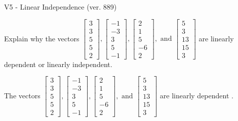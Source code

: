 \begin{exercise}
  \begin{exerciseTitle}V5 - Linear Independence (ver. 889)\end{exerciseTitle}
  \begin{exerciseStatement}
    Explain why the vectors \(\left[\begin{array}{r}
3 \\
3 \\
5 \\
5 \\
2
\end{array}\right] , \left[\begin{array}{r}
-1 \\
-3 \\
3 \\
5 \\
-1
\end{array}\right] , \left[\begin{array}{r}
2 \\
1 \\
5 \\
-6 \\
2
\end{array}\right] , \text{ and } \left[\begin{array}{r}
5 \\
3 \\
13 \\
15 \\
3
\end{array}\right]\) are linearly dependent or linearly independent.	


  \end{exerciseStatement}
  \begin{exerciseAnswer}
   The vectors \(\left[\begin{array}{r}
3 \\
3 \\
5 \\
5 \\
2
\end{array}\right] , \left[\begin{array}{r}
-1 \\
-3 \\
3 \\
5 \\
-1
\end{array}\right] , \left[\begin{array}{r}
2 \\
1 \\
5 \\
-6 \\
2
\end{array}\right] , \text{ and } \left[\begin{array}{r}
5 \\
3 \\
13 \\
15 \\
3
\end{array}\right]\) are 
  	 linearly dependent  .
  


  \end{exerciseAnswer}
\end{exercise}